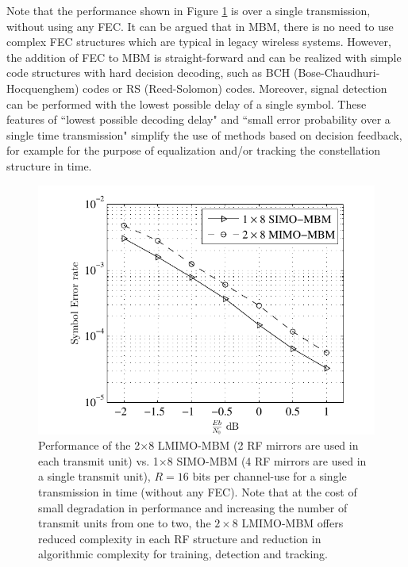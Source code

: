 Note that the performance shown in Figure \ref{MIMOvsSIMO} is over a single transmission, without using any FEC. It can be argued that in MBM, there is no need to use complex FEC structures which are typical in legacy wireless systems. However, the addition of FEC to MBM is straight-forward and can be realized with simple code structures with hard decision decoding, such as BCH (Bose-Chaudhuri-Hocquenghem) codes or RS (Reed-Solomon) codes. Moreover, signal detection can be performed with the lowest possible delay of a single symbol. These features of ``lowest possible decoding delay" and ``small error probability over a single time transmission" simplify the use of methods based on decision feedback, for example for the purpose of equalization and/or tracking the constellation structure in time.

\begin{figure}[t]
\centering
\hspace{1mm}
\includegraphics[scale = 1.02, trim = 6.5mm 0 -3mm 0 ]{./fig/MIMOvsSIMO2}
\caption{Performance of the 2$\times$8  LMIMO-MBM (2 RF mirrors are used in each transmit unit) vs. 1$\times$8 SIMO-MBM  (4 RF mirrors are used in a single transmit unit), $R = 16$ bits per channel-use for a single transmission in time (without any FEC). Note that at the cost of small degradation in performance and increasing the number of transmit units from one to two, the $2 \times 8$ LMIMO-MBM offers reduced complexity in each RF structure  and reduction in algorithmic complexity for training, detection and tracking.}
\label{MIMOvsSIMO}
\end{figure}


